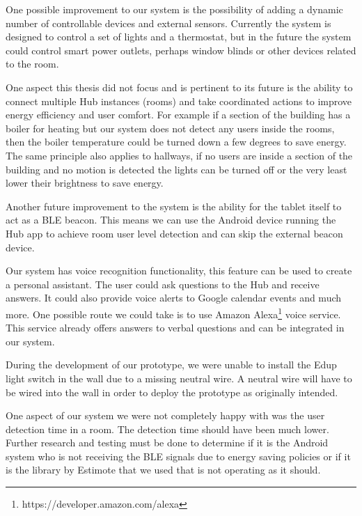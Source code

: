 One possible improvement to our system  is the possibility of adding a dynamic number of controllable devices and external sensors. Currently the system is designed to control a set of lights and a thermostat, but in the future the system could control smart power outlets, perhaps window blinds or other devices related to the room.

One aspect this thesis did not focus and is pertinent to its future is the ability to connect multiple Hub instances (rooms) and take coordinated actions to improve energy efficiency and user comfort. For example if a section of the building has a boiler for heating but our system does not detect any users inside the rooms, then the boiler temperature could be turned down a few degrees to save energy. The same principle also applies to hallways, if no users are inside a section of the building and no motion is detected the lights can be turned off or the very least lower their brightness to save energy.

Another future improvement to the system is the ability for the tablet itself to act as a \ac{BLE} beacon. This means we can use the Android device running the Hub app to achieve room user level detection and can skip the external beacon device.

Our system has voice recognition functionality, this feature can be used to create a personal assistant. The user could ask questions to the Hub and receive answers. It could also provide voice alerts to Google calendar events and much more. One possible route we could take is to use Amazon Alexa\footnote{https://developer.amazon.com/alexa} voice service. This service already offers answers to verbal questions and can be integrated in our system.

During the development of our prototype, we were unable to install the Edup light switch in the wall due to a missing neutral wire. A neutral wire will have to be wired into the wall in order to deploy the prototype as originally intended. 

One aspect of our system we were not completely happy with was the user detection time in a room. The detection time should have been much lower. Further research and testing must be done to determine if it is the Android system who is not receiving the BLE signals due to energy saving policies or if it is the library by Estimote that we used that is not operating as it should.


\cleardoublepage
